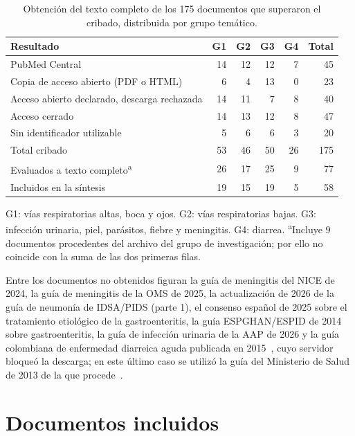 \documentclass[10pt,a4paper]{article}
\begin{document}
\begin{table}[htbp]
\centering
\caption{Obtención del texto completo de los 175 documentos que superaron el cribado, distribuida por grupo temático.}
\small
\begin{tabular}{@{}lrrrrr@{}}
\toprule
Resultado & G1 & G2 & G3 & G4 & Total \\
\midrule
PubMed Central & 14 & 12 & 12 & 7 & 45 \\
Copia de acceso abierto (PDF o HTML) & 6 & 4 & 13 & 0 & 23 \\
Acceso abierto declarado, descarga rechazada & 14 & 11 & 7 & 8 & 40 \\
Acceso cerrado & 14 & 13 & 12 & 8 & 47 \\
Sin identificador utilizable & 5 & 6 & 6 & 3 & 20 \\
\midrule
Total cribado & 53 & 46 & 50 & 26 & 175 \\
Evaluados a texto completo\textsuperscript{a} & 26 & 17 & 25 & 9 & 77 \\
Incluidos en la síntesis & 19 & 15 & 19 & 5 & 58 \\
\bottomrule
\end{tabular}

\vspace{2pt}
\begin{minipage}{0.9\textwidth}\footnotesize
G1: vías respiratorias altas, boca y ojos. G2: vías respiratorias bajas. G3: infección urinaria, piel, parásitos, fiebre y meningitis. G4: diarrea. \textsuperscript{a}Incluye 9 documentos procedentes del archivo del grupo de investigación; por ello no coincide con la suma de las dos primeras filas.
\end{minipage}
\end{table}

Entre los documentos no obtenidos figuran la guía de meningitis del NICE de 2024, la guía de meningitis de la OMS de 2025, la actualización de 2026 de la guía de neumonía de IDSA/PIDS (parte 1), el consenso español de 2025 sobre el tratamiento etiológico de la gastroenteritis, la guía ESPGHAN/ESPID de 2014 sobre gastroenteritis, la guía de infección urinaria de la AAP de 2026 y la guía colombiana de enfermedad diarreica aguda publicada en 2015~\citep{florez2015}, cuyo servidor bloqueó la descarga; en este último caso se utilizó la guía del Ministerio de Salud de 2013 de la que procede~\citep{gpc8}.

\section{Documentos incluidos}
\end{document}
